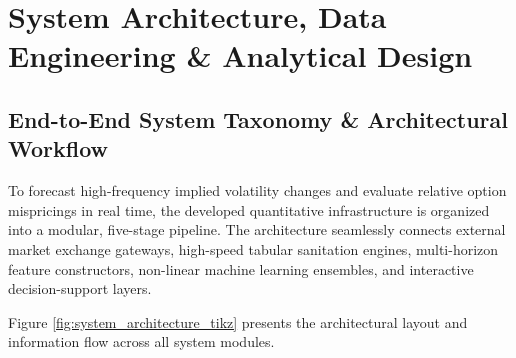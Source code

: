 \chapter{System Architecture, Data Engineering \& Analytical Design}
\label{chap:system_design}

\section{End-to-End System Taxonomy \& Architectural Workflow}
\label{sec:system_taxonomy}

To forecast high-frequency implied volatility changes and evaluate relative option mispricings in real time, the developed quantitative infrastructure is organized into a modular, five-stage pipeline. The architecture seamlessly connects external market exchange gateways, high-speed tabular sanitation engines, multi-horizon feature constructors, non-linear machine learning ensembles, and interactive decision-support layers.

Figure \ref{fig:system_architecture_tikz} presents the architectural layout and information flow across all system modules.

